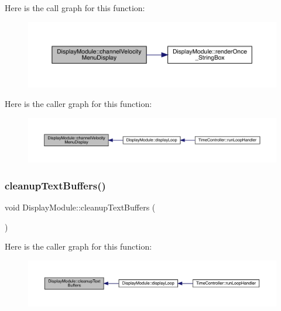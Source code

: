 Here is the call graph for this function\+:
\nopagebreak
\begin{figure}[H]
\begin{center}
\leavevmode
\includegraphics[width=350pt]{class_display_module_afb4cbf31bb1058fdeceb3d10ae7fe3a6_cgraph}
\end{center}
\end{figure}
Here is the caller graph for this function\+:
\nopagebreak
\begin{figure}[H]
\begin{center}
\leavevmode
\includegraphics[width=350pt]{class_display_module_afb4cbf31bb1058fdeceb3d10ae7fe3a6_icgraph}
\end{center}
\end{figure}
\mbox{\label{class_display_module_ab730677e34ecadf39916f9b71c2a41fe}} 
\subsubsection{\texorpdfstring{cleanup\+Text\+Buffers()}{cleanupTextBuffers()}}
{\footnotesize\ttfamily void Display\+Module\+::cleanup\+Text\+Buffers (\begin{DoxyParamCaption}{ }\end{DoxyParamCaption})}

Here is the caller graph for this function\+:
\nopagebreak
\begin{figure}[H]
\begin{center}
\leavevmode
\includegraphics[width=350pt]{class_display_module_ab730677e34ecadf39916f9b71c2a41fe_icgraph}
\end{center}
\end{figure}
\mbox{\label{class_display_module_a1e2ecbe240db8c38bea2839a76c566f0}} 
